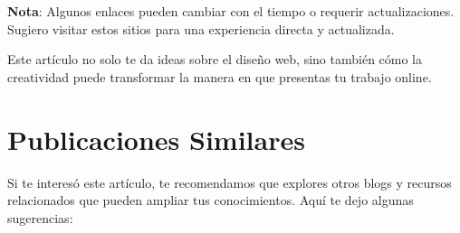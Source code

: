 \documentclass[
  jou,
  floatsintext,
  longtable,
  a4paper,
  nolmodern,
  notxfonts,
  notimes,
  colorlinks=true,linkcolor=blue,citecolor=blue,urlcolor=blue]{apa7}
\begin{document}
\textbf{Nota}: Algunos enlaces pueden cambiar con el tiempo o requerir
actualizaciones. Sugiero visitar estos sitios para una experiencia
directa y actualizada.

Este artículo no solo te da ideas sobre el diseño web, sino también cómo
la creatividad puede transformar la manera en que presentas tu trabajo
online.

\section{Publicaciones Similares}\label{publicaciones-similares}

Si te interesó este artículo, te recomendamos que explores otros blogs y
recursos relacionados que pueden ampliar tus conocimientos. Aquí te dejo
algunas sugerencias:
\end{document}
